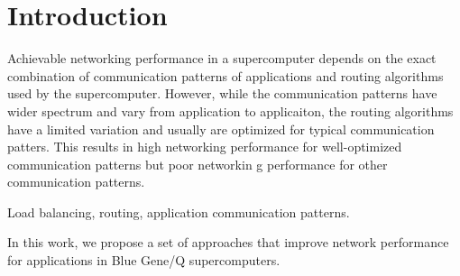 \section{Introduction}

Achievable networking performance in a supercomputer depends on the exact combination of communication patterns of applications and routing algorithms used by the supercomputer. However, while the communication patterns have wider spectrum and vary from application to applicaiton, the routing algorithms have a limited variation
and usually are optimized for typical communication patters. This results in high networking performance for well-optimized communication patterns but poor networkin
g performance for other communication patterns.

Load balancing, routing, application communication patterns.

In this work, we propose a set of approaches that improve network performance for applications in Blue Gene/Q supercomputers. 
